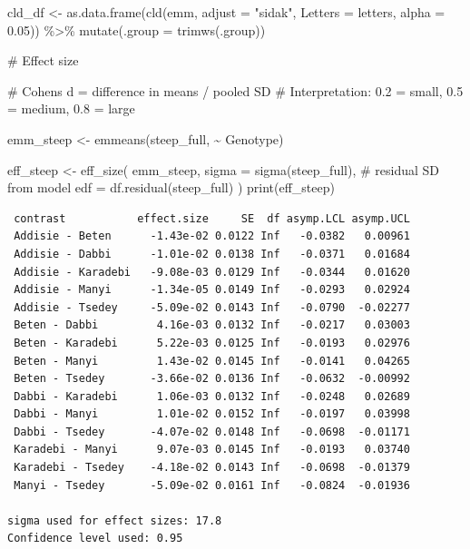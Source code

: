 \documentclass[
  letterpaper,
  DIV=11,
  numbers=noendperiod]{scrartcl}
\newenvironment{Shaded}{\begin{snugshade}}{\end{snugshade}}
\newcommand{\AttributeTok}[1]{\textcolor[rgb]{0.40,0.45,0.13}{#1}}
\newcommand{\CommentTok}[1]{\textcolor[rgb]{0.37,0.37,0.37}{#1}}
\newcommand{\FloatTok}[1]{\textcolor[rgb]{0.68,0.00,0.00}{#1}}
\newcommand{\FunctionTok}[1]{\textcolor[rgb]{0.28,0.35,0.67}{#1}}
\newcommand{\NormalTok}[1]{\textcolor[rgb]{0.00,0.23,0.31}{#1}}
\newcommand{\OtherTok}[1]{\textcolor[rgb]{0.00,0.23,0.31}{#1}}
\newcommand{\SpecialCharTok}[1]{\textcolor[rgb]{0.37,0.37,0.37}{#1}}
\newcommand{\StringTok}[1]{\textcolor[rgb]{0.13,0.47,0.30}{#1}}
\begin{document}
\begin{Shaded}
\begin{Highlighting}[]
\NormalTok{cld\_df }\OtherTok{\textless{}{-}} \FunctionTok{as.data.frame}\NormalTok{(}\FunctionTok{cld}\NormalTok{(emm, }\AttributeTok{adjust =} \StringTok{"sidak"}\NormalTok{,}
                             \AttributeTok{Letters =}\NormalTok{ letters, }\AttributeTok{alpha =} \FloatTok{0.05}\NormalTok{)) }\SpecialCharTok{\%\textgreater{}\%}
  \FunctionTok{mutate}\NormalTok{(}\AttributeTok{.group =} \FunctionTok{trimws}\NormalTok{(.group))}

\CommentTok{\# Effect size}

\CommentTok{\# Cohen\textquotesingle{}s d = difference in means / pooled SD}
\CommentTok{\# Interpretation: 0.2 = small, 0.5 = medium, 0.8 = large}

\NormalTok{emm\_steep }\OtherTok{\textless{}{-}} \FunctionTok{emmeans}\NormalTok{(steep\_full, }\SpecialCharTok{\textasciitilde{}}\NormalTok{ Genotype)}

\NormalTok{eff\_steep }\OtherTok{\textless{}{-}} \FunctionTok{eff\_size}\NormalTok{(}
\NormalTok{  emm\_steep,}
  \AttributeTok{sigma =} \FunctionTok{sigma}\NormalTok{(steep\_full),   }\CommentTok{\# residual SD from model}
  \AttributeTok{edf   =} \FunctionTok{df.residual}\NormalTok{(steep\_full)}
\NormalTok{) }
\FunctionTok{print}\NormalTok{(eff\_steep)}
\end{Highlighting}
\end{Shaded}

\begin{verbatim}
 contrast           effect.size     SE  df asymp.LCL asymp.UCL
 Addisie - Beten      -1.43e-02 0.0122 Inf   -0.0382   0.00961
 Addisie - Dabbi      -1.01e-02 0.0138 Inf   -0.0371   0.01684
 Addisie - Karadebi   -9.08e-03 0.0129 Inf   -0.0344   0.01620
 Addisie - Manyi      -1.34e-05 0.0149 Inf   -0.0293   0.02924
 Addisie - Tsedey     -5.09e-02 0.0143 Inf   -0.0790  -0.02277
 Beten - Dabbi         4.16e-03 0.0132 Inf   -0.0217   0.03003
 Beten - Karadebi      5.22e-03 0.0125 Inf   -0.0193   0.02976
 Beten - Manyi         1.43e-02 0.0145 Inf   -0.0141   0.04265
 Beten - Tsedey       -3.66e-02 0.0136 Inf   -0.0632  -0.00992
 Dabbi - Karadebi      1.06e-03 0.0132 Inf   -0.0248   0.02689
 Dabbi - Manyi         1.01e-02 0.0152 Inf   -0.0197   0.03998
 Dabbi - Tsedey       -4.07e-02 0.0148 Inf   -0.0698  -0.01171
 Karadebi - Manyi      9.07e-03 0.0145 Inf   -0.0193   0.03740
 Karadebi - Tsedey    -4.18e-02 0.0143 Inf   -0.0698  -0.01379
 Manyi - Tsedey       -5.09e-02 0.0161 Inf   -0.0824  -0.01936

sigma used for effect sizes: 17.8 
Confidence level used: 0.95 
\end{verbatim}
\end{document}

